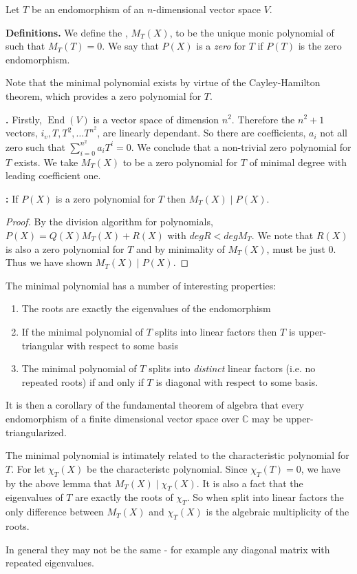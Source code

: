 \documentclass[12pt]{article}
\begin{document}
Let $T$ be an endomorphism of an $n$-dimensional vector space $V$.

{\bf Definitions.}
We define the \emph{}, $M_T(X)$, to be the unique monic polynomial of  such that $M_T(T) = 0$. We say that $P(X)$ is a \emph{zero } for $T$ if $P(T)$ is the zero endomorphism.

Note that the minimal polynomial exists by virtue of the Cayley-Hamilton theorem, which provides a zero polynomial for $T$.

{\bf {}.}
Firstly, $\operatorname{End}(V)$ is a vector space of dimension $n^2$. Therefore the $n^2 + 1$ vectors, $i_v, T, T^2, \ldots T^{n^2}$, are linearly dependant. So there are coefficients, $a_i$ not all zero such that $\sum_{i=0}^{n^2} a_i T^i = 0$. We conclude that a non-trivial zero polynomial for $T$ exists. We take $M_T(X)$ to be a zero polynomial for $T$ of minimal degree with leading coefficient one.

{\bf {}:} If $P(X)$ is a zero polynomial for $T$ then $M_T(X) \mid P(X)$.

\begin{proof}
By the division algorithm for polynomials, $P(X) = Q(X)M_T(X) + R(X)$ with $deg R < deg M_T$. We note that $R(X)$ is also a zero polynomial for $T$ and by minimality of $M_T(X)$, must be just $0$. Thus we have shown $M_T(X) \mid P(X)$.
\end{proof}

The minimal polynomial has a number of interesting properties:

\begin{enumerate}
\item The roots are exactly the eigenvalues of the endomorphism
\item If the minimal polynomial of $T$ splits into linear factors then $T$ is upper-triangular with respect to some basis
\item The minimal polynomial of $T$ splits into \emph{distinct} linear factors (i.e. no repeated roots) if and only if $T$ is diagonal with respect to some basis.
\end{enumerate}


It is then a  corollary of the fundamental theorem of algebra that every endomorphism of a finite dimensional vector space over $\mathbb{C}$ may be upper-triangularized.

The minimal polynomial is intimately related to the characteristic polynomial for $T$. For let $\chi_T(X)$ be the characteristc polynomial. Since $\chi_T(T)=0$, we have by the above lemma that $M_T(X) \mid \chi_T(X)$. It is also a fact that the eigenvalues of $T$ are exactly the roots of $\chi_T$. So when split into linear factors the only difference between $M_T(X)$ and $\chi_T(X)$ is the algebraic multiplicity of the roots.

In general they may not be the same - for example any diagonal matrix with repeated eigenvalues.
\end{document}
